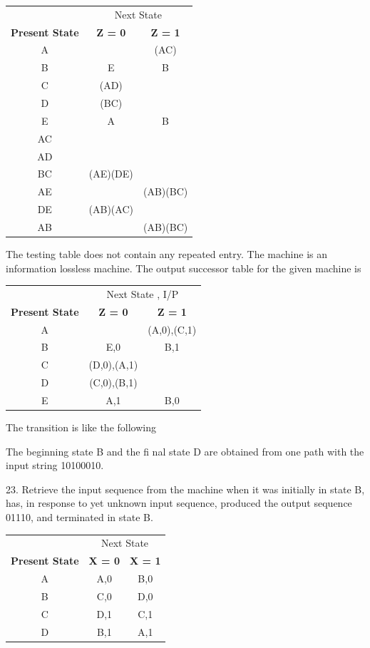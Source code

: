 \documentclass{book}
\begin{document}
\begin{center}
	\begin{tabular}{ccc}
		\hline
		& \multicolumn{2}{c}{Next State}\\
		\cline{2-3}
		\textbf{Present State} & \textbf{Z = 0} & \textbf{Z = 1}\\
		\hline
		A & & (AC)\\
		B & E & B\\
		C & (AD)\\
		D &(BC)\\
		E & A & B\\
		\hline
		AC\\
		AD\\
		BC & (AE)(DE)\\
		AE & & (AB)(BC)\\
		DE & (AB)(AC)\\
		AB & & (AB)(BC)\\
		\hline
	\end{tabular}
\end{center}

The testing table does not contain any repeated entry. The machine is an information lossless machine. The output successor table for the given machine is

\begin{center}
	\begin{tabular}{ccc}
		\hline
		& \multicolumn{2}{c}{Next State , I/P}\\
		\cline{2-3}
		\textbf{Present State} & \textbf{Z = 0} & \textbf{Z = 1}\\
		\hline
		A & & (A,0),(C,1)\\
		B & E,0 & B,1\\
		C & (D,0),(A,1)\\
		D & (C,0),(B,1)\\
		E & A,1 & B,0\\
		\hline
	\end{tabular}
\end{center}

The transition is like the following

The beginning state B and the ﬁ nal state D are obtained from one path with the input string 10100010.

 23. Retrieve the input sequence from the machine when it was initially in state B, has, in response to yet unknown input sequence, produced the output sequence 01110, and terminated in state B.
 
 \begin{center}
 	\begin{tabular}{ccc}
 		\hline
 		& \multicolumn{2}{c}{Next State}\\
 		\cline{2-3}
 		\textbf{Present State} & \textbf{X = 0} & \textbf{X = 1}\\
 		\hline
 		A & A,0 & B,0\\
 		B & C,0 & D,0\\
 		C & D,1 & C,1\\
 		D & B,1 & A,1\\
 		\hline
 	\end{tabular}
 \end{center} 

	
\end{document}
